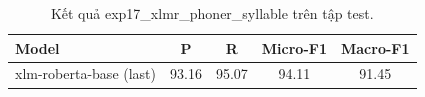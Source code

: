 \begin{table}[t]
\centering
\begin{tabular}{lcccc}
\hline
\textbf{Model} & \textbf{P} & \textbf{R} & \textbf{Micro-F1} & \textbf{Macro-F1} \\
\hline
xlm-roberta-base (last) & 93.16 & 95.07 & 94.11 & 91.45 \\
\hline
\end{tabular}
\caption{Kết quả exp17_xlmr_phoner_syllable trên tập test.}
\label{tab:main}
\end{table}